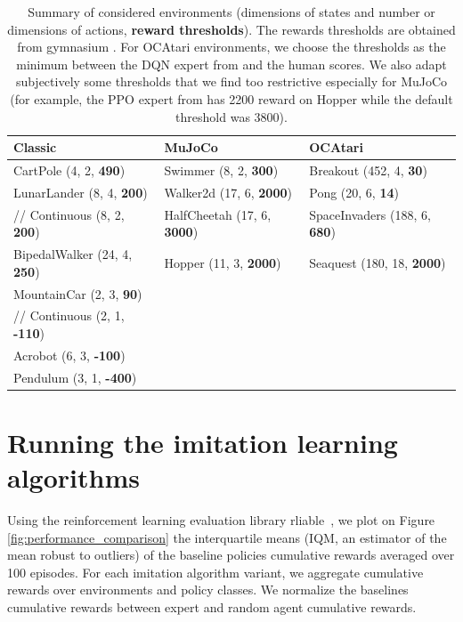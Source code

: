 \begin{table}[ht]
  \centering
  \small
  \begin{tabular}{lll}
  \hline
  \textbf{Classic} & \textbf{MuJoCo} & \textbf{OCAtari}\\
  \hline
  CartPole (4, 2, \textbf{490}) & Swimmer (8, 2, \textbf{300}) & Breakout (452, 4, \textbf{30})\\
  LunarLander (8, 4, \textbf{200}) & Walker2d (17, 6, \textbf{2000}) & Pong (20, 6, \textbf{14})\\
  //    Continuous (8, 2, \textbf{200}) & HalfCheetah (17, 6, \textbf{3000}) & SpaceInvaders (188, 6, \textbf{680})\\
  BipedalWalker (24, 4, \textbf{250}) & Hopper (11, 3, \textbf{2000}) & Seaquest (180, 18, \textbf{2000})\\
  MountainCar (2, 3, \textbf{90}) & \\
  //    Continuous (2, 1, \textbf{-110}) & \\
  Acrobot (6, 3, \textbf{-100}) & \\
  Pendulum (3, 1, \textbf{-400}) & \\
  \hline
  \end{tabular}
  \caption{Summary of considered environments (dimensions of states and number or dimensions of actions, \textbf{reward thresholds}). The rewards thresholds are obtained from gymnasium \citep{gymnasium}. For OCAtari environments, we choose the thresholds as the minimum between the DQN expert from \citet{zoo} and the human scores. We also adapt subjectively some thresholds that we find too restrictive especially for MuJoCo (for example, the PPO expert from \citet{zoo} has 2200 reward on Hopper while the default threshold was 3800).}
  \label{tab:envs}
  \end{table}


\section{Running the imitation learning algorithms}
Using the reinforcement learning evaluation library rliable~\cite{rliable}, we plot on Figure \ref{fig:performance_comparison} the interquartile means (IQM, an estimator of the mean robust to outliers) of the baseline policies cumulative rewards averaged over 100 episodes.
For each imitation algorithm variant, we aggregate cumulative rewards over environments and policy classes.
We normalize the baselines cumulative rewards between expert and random agent cumulative rewards.

